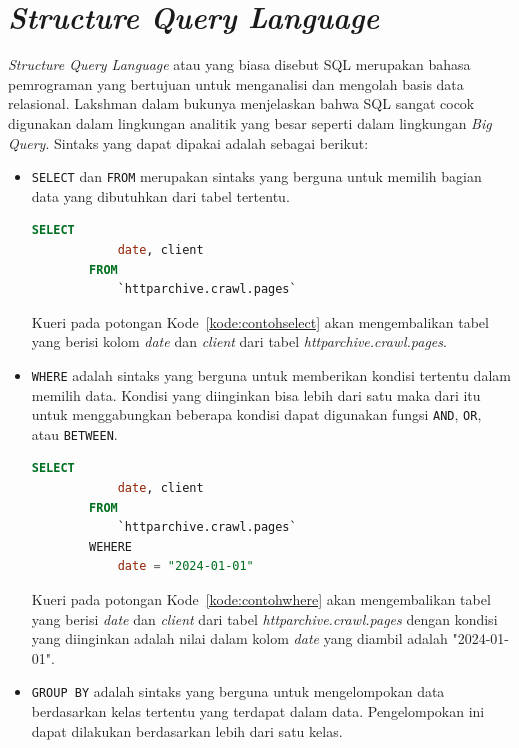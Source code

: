 \section{\textit{Structure Query Language}~\cite{book:SQLBigQuery}}
\label{sec:sql} 
\textit{Structure Query Language} atau yang biasa disebut SQL merupakan bahasa pemrograman yang bertujuan untuk menganalisi dan mengolah basis data relasional. Lakshman dalam bukunya menjelaskan bahwa SQL sangat cocok digunakan dalam lingkungan analitik yang besar seperti dalam lingkungan \textit{Big Query}. Sintaks yang dapat dipakai adalah sebagai berikut:
\begin{itemize}
    \item \verb|SELECT| dan \verb|FROM| merupakan sintaks yang berguna untuk memilih bagian data yang dibutuhkan dari tabel tertentu.
    \begin{lstlisting}[language=SQL, caption=contoh penggunaan sintaks \lstinline|SELECT|, label=kode:contohselect]
        SELECT
            date, client
        FROM
            `httparchive.crawl.pages`
    \end{lstlisting}
    Kueri pada potongan Kode~\ref{kode:contohselect} akan mengembalikan tabel yang berisi kolom \textit{date} dan \textit{client} dari tabel \textit{httparchive.crawl.pages}.
    \item \verb|WHERE| adalah sintaks yang berguna untuk memberikan kondisi tertentu dalam memilih data. Kondisi yang diinginkan bisa lebih dari satu maka dari itu untuk menggabungkan beberapa kondisi dapat digunakan fungsi \verb|AND|, \verb|OR|, atau \verb|BETWEEN|.
        \begin{lstlisting}[language=SQL, caption=contoh penggunaan sintaks \lstinline|WHERE|, label=kode:contohwhere]
        SELECT
            date, client
        FROM
            `httparchive.crawl.pages`
        WEHERE
            date = "2024-01-01"
    \end{lstlisting}
    Kueri pada potongan Kode~\ref{kode:contohwhere} akan mengembalikan tabel yang berisi \textit{date} dan \textit{client} dari tabel \textit{httparchive.crawl.pages} dengan kondisi yang diinginkan adalah nilai dalam kolom \textit{date} yang diambil adalah "2024-01-01".
    \item \verb|GROUP BY| adalah sintaks yang berguna untuk mengelompokan data berdasarkan kelas tertentu yang terdapat dalam data. Pengelompokan ini dapat dilakukan berdasarkan lebih dari satu kelas.
        \begin{lstlisting}[language=SQL, caption=contoh penggunaan sintaks \lstinline|GROUP BY|, label=kode:contohgroupby]

\end{lstlisting}
\end{itemize}
